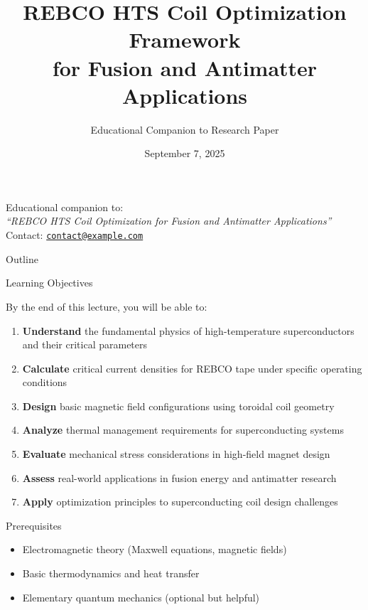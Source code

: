 \documentclass[aspectratio=169,xcolor={table,dvipsnames}]{beamer}
\title[REBCO HTS Coil Optimization]{REBCO HTS Coil Optimization Framework\\for Fusion and Antimatter Applications}
\subtitle{Educational Companion to Research Paper}
\author[\authorname]{\authorname}
\institute[\authoraffiliation]{\textit{\authoraffiliation}}
\date{September 7, 2025}
\makeatletter
\providecommand{\authoremail}{contact@example.com}%
\makeatother
\begin{document}
\begin{frame}
    \titlepage
    \begin{center}
        \small
        Educational companion to:\\
        \textit{``REBCO HTS Coil Optimization for Fusion and Antimatter Applications''}\\
    \vspace{0.3cm}
    	{Contact:} \href{mailto:\authoremail}{\texttt{\authoremail}}
    \end{center}
\end{frame}

\begin{frame}{Outline}
    \tableofcontents
\end{frame}

\begin{frame}{Learning Objectives}
    \begin{block}{By the end of this lecture, you will be able to:}
        \begin{enumerate}
            \item \textbf{Understand} the fundamental physics of high-temperature superconductors and their critical parameters
            \item \textbf{Calculate} critical current densities for REBCO tape under specific operating conditions
            \item \textbf{Design} basic magnetic field configurations using toroidal coil geometry
            \item \textbf{Analyze} thermal management requirements for superconducting systems
            \item \textbf{Evaluate} mechanical stress considerations in high-field magnet design
            \item \textbf{Assess} real-world applications in fusion energy and antimatter research
            \item \textbf{Apply} optimization principles to superconducting coil design challenges
        \end{enumerate}
    \end{block}
    
    \begin{alertblock}{Prerequisites}
        \begin{itemize}
            \item Electromagnetic theory (Maxwell equations, magnetic fields)
            \item Basic thermodynamics and heat transfer
            \item Elementary quantum mechanics (optional but helpful)
        \end{itemize}
    \end{alertblock}
\end{frame}
\end{document}
